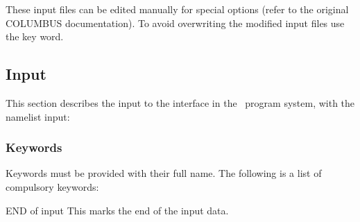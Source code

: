 These input files can be edited manually for special options (refer to
the original COLUMBUS documentation). To avoid overwriting the modified
input files use the  key word. 

\subsection{Input}
\label{UG:sec:columbus_input}
This section describes the input to the
 interface in the \molcas\ program system, with
the namelist input:

 
\subsubsection{Keywords}
 
Keywords must be provided with their full name.
The following is a list of compulsory keywords:
 
\begin{keywordlist}
\item[END of input]
This marks the end of the input data.
\end{keywordlist}
 
